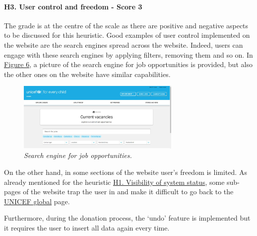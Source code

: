 







\paragraph{H3. User control and freedom - Score 3} \label{subsec:H3}	The grade is at the centre of the scale as there are positive and negative aspects to be discussed for this heuristic. Good examples of user control implemented on the website are the search engines spread across the website. Indeed, users can engage with these search engines by applying filters, removing them and so on. In \hyperref[fig:job]{Figure 6}, a picture of the search engine for job opportunities is provided, but also the other ones on the website have similar capabilities. 
\begin{figure}[!h]
	\label{fig:job}
	\begin{center}
		\includegraphics[width=0.7\textwidth]{FinalScores6.jpg}
		\captionsetup{font=small}
		\caption{\textit{Search engine for job opportunities.}}
	\end{center}
\end{figure}
\newline On the other hand, in some sections of the website user's freedom is limited.
As already mentioned for the heuristic \hyperref[subsec:H1]{H1. Visibility of system status}, some sub-pages of the website trap the user in and make it difficult to go back to the \href{https://www.unicef.org/}{UNICEF global} page.

Furthermore, during the donation process, the ‘undo’ feature is implemented but it requires the user to insert all data again every time.

